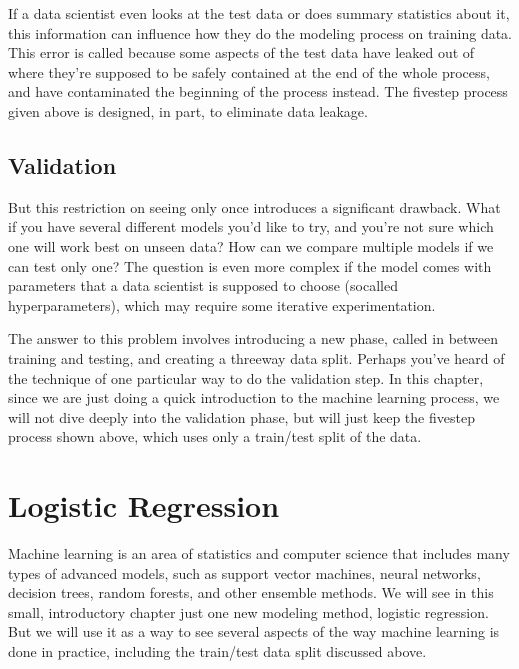 \documentclass[letterpaper,10pt,english]{sphinxmanual}
\begin{document}
If a data scientist even looks at the test data or does summary statistics about it, this information can influence how they do the modeling process on training data.  This error is called  because some aspects of the test data have leaked out of where they’re supposed to be safely contained at the end of the whole process, and have contaminated the beginning of the process instead.  The five\sphinxhyphen{}step process given above is designed, in part, to eliminate data leakage.


\subsection{Validation}
\label{\detokenize{chapter-17-machine-learning:validation}}
But this restriction on seeing  only once introduces a significant drawback.  What if you have several different models you’d like to try, and you’re not sure which one will work best on unseen data?  How can we compare multiple models if we can test only one?  The question is even more complex if the model comes with parameters that a data scientist is supposed to choose (so\sphinxhyphen{}called hyperparameters), which may require some iterative experimentation.

The answer to this problem involves introducing a new phase, called  in between training and testing, and creating a three\sphinxhyphen{}way data split.  Perhaps you’ve heard of the technique of  one particular way to do the validation step.  In this chapter, since we are just doing a quick introduction to the machine learning process, we will not dive deeply into the validation phase, but will just keep the five\sphinxhyphen{}step process shown above, which uses only a train/test split of the data.


\section{Logistic Regression}
\label{\detokenize{chapter-17-machine-learning:logistic-regression}}
Machine learning is an area of statistics and computer science that includes many types of advanced models, such as support vector machines, neural networks, decision trees, random forests, and other ensemble methods.  We will see in this small, introductory chapter just one new modeling method, logistic regression.  But we will use it as a way to see several aspects of the way machine learning is done in practice, including the train/test data split discussed above.
\end{document}

